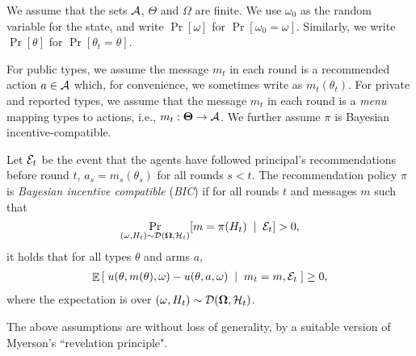 We assume that the sets $\mathcal{A}$, $\varTheta$ and $\varOmega$ are finite. We use $\omega_0$ as the random variable for the state, and write $\Pr[\omega]$ for $\Pr[\omega_0=\omega]$. Similarly, we write $\Pr[\theta]$ for $\Pr[\theta_t=\theta]$.

For public types, we assume the message $m_t$ in each round is a recommended action $a \in \mathcal{A}$ which, for convenience, we sometimes write as $m_t(\theta_t)$. For private and reported types, we assume that the message $m_t$ in each round is a \emph{menu} mapping types to actions, i.e., $m_t:\bold{\Theta}\rightarrow\mathcal{A}$.  
 We further assume $\pi$ is Bayesian incentive-compatible. 
\begin{definition}
Let $\mathcal{E}_t$ be the event that the agents have followed principal's recommendations before round $t$, \ie $a_s = m_s(\theta_s)$ for all rounds $s<t$.
The recommendation policy $\pi$ is {\em Bayesian incentive compatible} (\emph{BIC}) if for all rounds $t$ and messages $m$ such that
\[ \Pr_{(\omega,H_t)\sim\mathcal{D}(\bold{\Omega},\mathcal{H}_t)}
    [m = \pi(H_t)\; \mid\; \mathcal{E}_{t}] > 0,
\]
it holds that for all types $\theta$ and arms $a$,
\begin{align}\label{eq:model-BIC}
\mathop{\mathbb{E}}\left[\; u(\theta,m(\theta),\omega) - u(\theta,a,\omega) \; \mid\; m_t=m, \mathcal{E}_{t}\;\right] \geq 0,
\end{align}
where the expectation is over $(\omega,H_t)\sim\mathcal{D}(\bold{\Omega},\mathcal{H}_t)$.
\end{definition}

\noindent The above assumptions are without loss of generality, by a suitable version of Myerson's ``revelation principle".

\iffalse
For reported types and private types, we assume that the message in each round is a \emph{menu} a mapping types to actions, and assume that the recommendation policy satisfies a similar but technically different BIC condition. Again, this is without loss of generality by revelation principle. to state the BIC condition, let $\pi^t$ be the menu recommended in round $t$. The recommendation policy $\pi$ is BIC if for each round $t$, type $\theta$, and any two menus $m,m'$ such that
    $\Pr[\pi^t= m|\EE_{t-1}] > 0$, we have
\begin{align}\label{eq:model-BIC-menus}
\E\left[\; u(\theta,m(\theta),\omega) - u(\theta,m'(\theta),\omega)
    \mid \pi^t = m, \EE_{t-1}\;\right] \geq 0.
\end{align}
(Again, the expectation is over the realized state $\omega$ and the randomness in the policy.)
\fi

